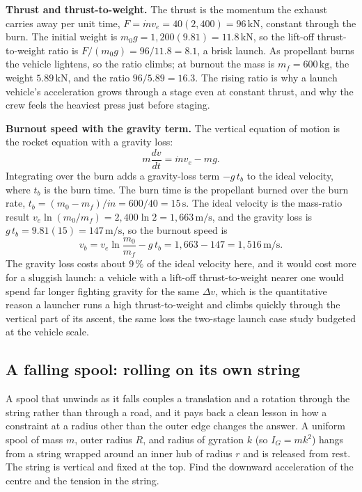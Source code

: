\textbf{Thrust and thrust-to-weight.} The thrust is the momentum the
exhaust carries away per unit time, $F=\dot{m}v_{e}=40(2{,}400)=96\,\si{
\kilo\newton}$, constant through the burn. The initial weight is
$m_{0}g=1{,}200(9.81)=11.8\,\si{\kilo\newton}$, so the lift-off
thrust-to-weight ratio is $F/(m_{0}g)=96/11.8=8.1$, a brisk launch. As
propellant burns the vehicle lightens, so the ratio climbs; at burnout
the mass is $m_{f}=600\,\si{\kilogram}$, the weight $5.89\,\si{\kilo
\newton}$, and the ratio $96/5.89=16.3$. The rising ratio is why a
launch vehicle's acceleration grows through a stage even at constant
thrust, and why the crew feels the heaviest press just before staging.

\textbf{Burnout speed with the gravity term.} The vertical equation of
motion is the rocket equation with a gravity loss:
\[
m\frac{dv}{dt}=\dot{m}v_{e}-mg.
\]
Integrating over the burn adds a gravity-loss term $-g\,t_{b}$ to the
ideal velocity, where $t_{b}$ is the burn time. The burn time is the
propellant burned over the burn rate, $t_{b}=(m_{0}-m_{f})/\dot{m}=
600/40=15\,\si{\second}$. The ideal velocity is the mass-ratio result
$v_{e}\ln(m_{0}/m_{f})=2{,}400\ln 2=1{,}663\,\si{\meter\per\second}$, and
the gravity loss is $g\,t_{b}=9.81(15)=147\,\si{\meter\per\second}$, so
the burnout speed is
\[
v_{b}=v_{e}\ln\frac{m_{0}}{m_{f}}-g\,t_{b}=1{,}663-147=1{,}516\,\si{
\meter\per\second}.
\]
The gravity loss costs about $9\,\%$ of the ideal velocity here, and it
would cost more for a sluggish launch: a vehicle with a lift-off
thrust-to-weight nearer one would spend far longer fighting gravity for
the same $\Delta v$, which is the quantitative reason a launcher runs a
high thrust-to-weight and climbs quickly through the vertical part of
its ascent, the same loss the two-stage launch case study budgeted at
the vehicle scale.

\subsection{A falling spool: rolling on its own string}

A spool that unwinds as it falls couples a translation and a rotation
through the string rather than through a road, and it pays back a clean
lesson in how a constraint at a radius other than the outer edge changes
the answer. A uniform spool of mass $m$, outer radius $R$, and radius of
gyration $k$ (so $I_{G}=mk^{2}$) hangs from a string wrapped around an
inner hub of radius $r$ and is released from rest. The string is
vertical and fixed at the top. Find the downward acceleration of the
centre and the tension in the string.

